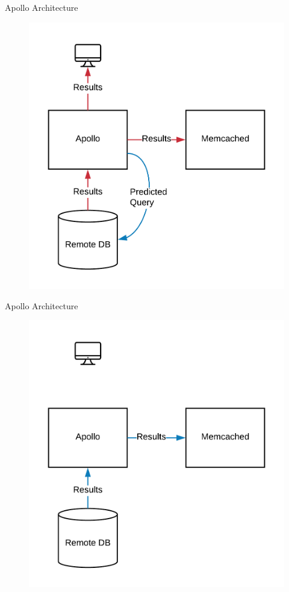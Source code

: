 \documentclass[10pt]{beamer}
\begin{document}
\begin{frame}[fragile]{Apollo Architecture}
    \begin{figure}
        \includegraphics[scale=0.17]{apollo_arch_diagram_7}
    \end{figure}
\end{frame}

\begin{frame}[fragile]{Apollo Architecture}
    \begin{figure}
        \includegraphics[scale=0.17]{apollo_arch_diagram_8}
    \end{figure}
\end{frame}
\end{document}
